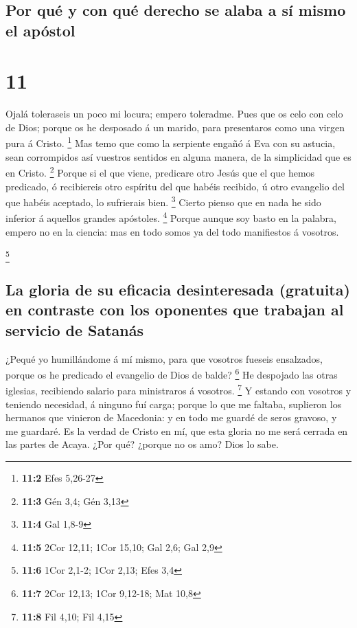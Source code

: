 \hypertarget{por-quuxe9-y-con-quuxe9-derecho-se-alaba-a-suxed-mismo-el-apuxf3stol}{%
\subsection{Por qué y con qué derecho se alaba a sí mismo el
apóstol}\label{por-quuxe9-y-con-quuxe9-derecho-se-alaba-a-suxed-mismo-el-apuxf3stol}}

\hypertarget{section-10}{%
\section{11}\label{section-10}}

 Ojalá toleraseis un poco mi locura; empero toleradme.
 Pues que os celo con celo de Dios; porque os he desposado
á un marido, para presentaros como una virgen pura á Cristo. \footnote{\textbf{11:2}
  Efes 5,26-27}  Mas temo que como la serpiente engañó á
Eva con su astucia, sean corrompidos así vuestros sentidos en alguna
manera, de la simplicidad que es en Cristo. \footnote{\textbf{11:3} Gén
  3,4; Gén 3,13}  Porque si el que viene, predicare otro
Jesús que el que hemos predicado, ó recibiereis otro espíritu del que
habéis recibido, ú otro evangelio del que habéis aceptado, lo sufrierais
bien. \footnote{\textbf{11:4} Gal 1,8-9}  Cierto pienso
que en nada he sido inferior á aquellos grandes apóstoles. \footnote{\textbf{11:5}
  2Cor 12,11; 1Cor 15,10; Gal 2,6; Gal 2,9}  Porque aunque
soy basto en la palabra, empero no en la ciencia: mas en todo somos ya
del todo manifiestos á vosotros.

\footnote{\textbf{11:6} 1Cor 2,1-2; 1Cor 2,13; Efes 3,4}

\hypertarget{la-gloria-de-su-eficacia-desinteresada-gratuita-en-contraste-con-los-oponentes-que-trabajan-al-servicio-de-satanuxe1s}{%
\subsection{La gloria de su eficacia desinteresada (gratuita) en
contraste con los oponentes que trabajan al servicio de
Satanás}\label{la-gloria-de-su-eficacia-desinteresada-gratuita-en-contraste-con-los-oponentes-que-trabajan-al-servicio-de-satanuxe1s}}

 ¿Pequé yo humillándome á mí mismo, para que vosotros
fueseis ensalzados, porque os he predicado el evangelio de Dios de
balde? \footnote{\textbf{11:7} 2Cor 12,13; 1Cor 9,12-18; Mat 10,8}
 He despojado las otras iglesias, recibiendo salario para
ministraros á vosotros. \footnote{\textbf{11:8} Fil 4,10; Fil 4,15}
 Y estando con vosotros y teniendo necesidad, á ninguno
fuí carga; porque lo que me faltaba, suplieron los hermanos que vinieron
de Macedonia: y en todo me guardé de seros gravoso, y me guardaré.
 Es la verdad de Cristo en mí, que esta gloria no me será
cerrada en las partes de Acaya.  ¿Por qué? ¿porque no os
amo? Dios lo sabe.

